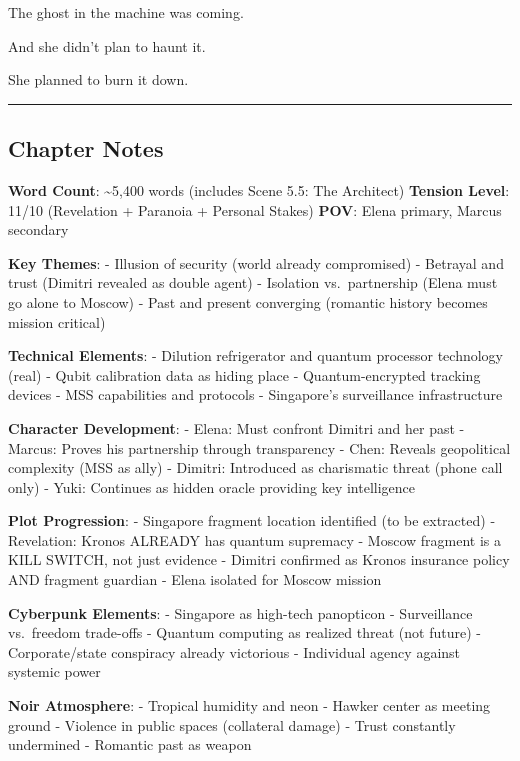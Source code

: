 \documentclass[12pt,letterpaper]{book}
\begin{document}
The ghost in the machine was coming.

And she didn't plan to haunt it.

She planned to burn it down.

\begin{center}\rule{0.5\linewidth}{0.5pt}\end{center}

\hypertarget{chapter-notes}{%
\subsection{Chapter Notes}\label{chapter-notes}}

\textbf{Word Count}: \textasciitilde5,400 words (includes Scene 5.5: The Architect) \textbf{Tension Level}: 11/10 (Revelation + Paranoia + Personal Stakes) \textbf{POV}: Elena primary, Marcus secondary

\textbf{Key Themes}: - Illusion of security (world already compromised) - Betrayal and trust (Dimitri revealed as double agent) - Isolation vs.~partnership (Elena must go alone to Moscow) - Past and present converging (romantic history becomes mission critical)

\textbf{Technical Elements}: - Dilution refrigerator and quantum processor technology (real) - Qubit calibration data as hiding place - Quantum-encrypted tracking devices - MSS capabilities and protocols - Singapore's surveillance infrastructure

\textbf{Character Development}: - Elena: Must confront Dimitri and her past - Marcus: Proves his partnership through transparency - Chen: Reveals geopolitical complexity (MSS as ally) - Dimitri: Introduced as charismatic threat (phone call only) - Yuki: Continues as hidden oracle providing key intelligence

\textbf{Plot Progression}: - Singapore fragment location identified (to be extracted) - Revelation: Kronos ALREADY has quantum supremacy - Moscow fragment is a KILL SWITCH, not just evidence - Dimitri confirmed as Kronos insurance policy AND fragment guardian - Elena isolated for Moscow mission

\textbf{Cyberpunk Elements}: - Singapore as high-tech panopticon - Surveillance vs.~freedom trade-offs - Quantum computing as realized threat (not future) - Corporate/state conspiracy already victorious - Individual agency against systemic power

\textbf{Noir Atmosphere}: - Tropical humidity and neon - Hawker center as meeting ground - Violence in public spaces (collateral damage) - Trust constantly undermined - Romantic past as weapon
\end{document}
